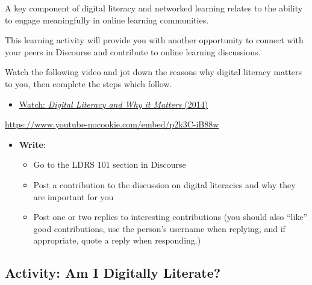 \documentclass[
  letterpaper,
  DIV=11,
  numbers=noendperiod]{scrreprt}
\providecommand{\tightlist}{%
  \setlength{\itemsep}{0pt}\setlength{\parskip}{0pt}}\usepackage{longtable,booktabs,array}
\begin{document}
\begin{tcolorbox}[enhanced jigsaw, toprule=.15mm, colback=white, colframe=quarto-callout-note-color-frame, bottomtitle=1mm, leftrule=.75mm, coltitle=black, titlerule=0mm, rightrule=.15mm, colbacktitle=quarto-callout-note-color!10!white, left=2mm, title={Learning Activity}, opacitybacktitle=0.6, opacityback=0, breakable, toptitle=1mm, arc=.35mm, bottomrule=.15mm]

A key component of digital literacy and networked learning relates to
the ability to engage meaningfully in online learning communities.

This learning activity will provide you with another opportunity to
connect with your peers in Discourse and contribute to online learning
discussions.

Watch the following video and jot down the reasons why digital literacy
matters to you, then complete the steps which follow.

\begin{itemize}
\tightlist
\item
  \href{https://www.youtube.com/watch?v=p2k3C-iB88w}{Watch:
  \emph{Digital Literacy and Why it Matters} (2014)}
\end{itemize}

\url{https://www.youtube-nocookie.com/embed/p2k3C-iB88w}

\begin{itemize}
\tightlist
\item
  \textbf{Write}:

  \begin{itemize}
  \tightlist
  \item
    Go to the LDRS 101 section in Discourse
  \item
    Post a contribution to the discussion on digital literacies and why
    they are important for you
  \item
    Post one or two replies to interesting contributions (you should
    also ``like'' good contributions, use the person's username when
    replying, and if appropriate, quote a reply when responding.)
  \end{itemize}
\end{itemize}

\end{tcolorbox}

\subsection{Activity: Am I Digitally
Literate?}\label{activity-am-i-digitally-literate}
\end{document}
